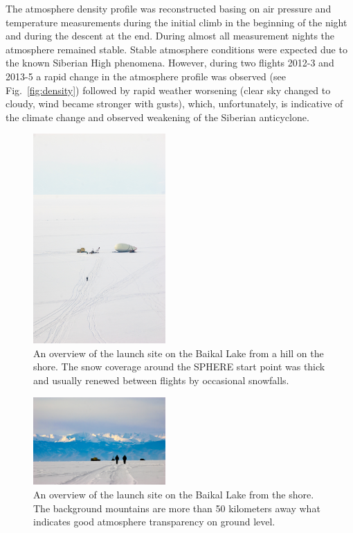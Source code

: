 \documentclass[final,5p,times,twocolumn]{elsarticle}
\begin{document}
The atmosphere density profile was reconstructed basing on air pressure and temperature measurements during the initial climb in the beginning of the night and during the descent at the end. During almost all measurement nights the atmosphere remained stable. Stable atmosphere conditions were expected due to the known Siberian High phenomena. However, during two flights 2012-3 and 2013-5 a rapid change in the atmosphere profile was observed (see Fig.~\ref{fig:density}) followed by rapid weather worsening (clear sky changed to cloudy, wind became stronger with gusts), which, unfortunately, is indicative of the climate change and observed weakening of the Siberian anticyclone. 

\begin{figure}[tb]
\begin{center}
    \includegraphics[trim=1cm 5cm 0cm 5cm,clip,width=0.45\textwidth]{DSC_4049.jpg}\hspace{2pc}%
    \caption{An overview of the launch site on the Baikal Lake from a hill on the shore. The snow coverage around the SPHERE start point was thick and usually renewed between flights by occasional snowfalls.}
\label{fig:baikal_snow}
\end{center}
\end{figure}
\begin{figure}[tb]
\begin{center}
    \includegraphics[width=0.45\textwidth]{DSC_7423.jpg}\hspace{2pc}%
    \caption{An overview of the launch site on the Baikal Lake from the shore. The background mountains are more than 50 kilometers away what indicates good atmosphere transparency on ground level.}
\label{fig:baikal_atmo}
\end{center}
\end{figure}
\end{document}

